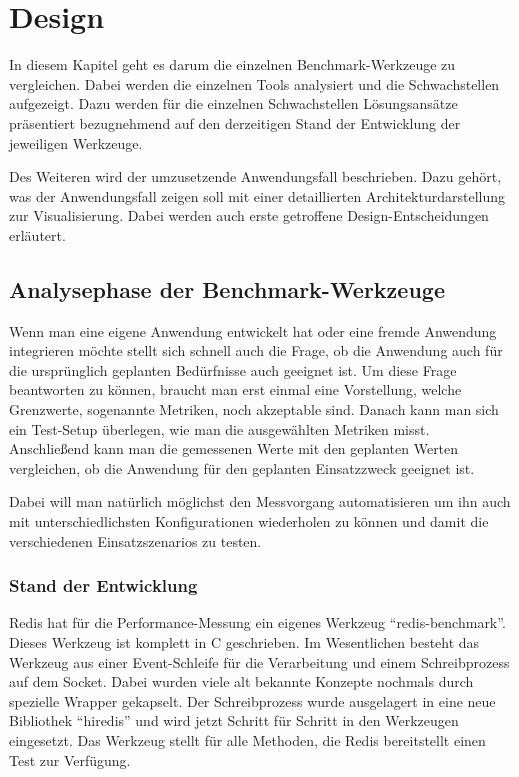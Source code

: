 \chapter{Design}
In diesem Kapitel geht es darum die einzelnen Benchmark-Werkzeuge zu
vergleichen. Dabei werden die einzelnen Tools analysiert und die Schwachstellen
aufgezeigt. Dazu werden für die einzelnen Schwachstellen Lösungsansätze
präsentiert bezugnehmend auf den derzeitigen Stand der Entwicklung der
jeweiligen Werkzeuge.

Des Weiteren wird der umzusetzende Anwendungsfall beschrieben. Dazu gehört, was
der Anwendungsfall zeigen soll mit einer detaillierten Architekturdarstellung
zur Visualisierung. Dabei werden auch erste getroffene Design-Entscheidungen
erläutert.

\section{Analysephase der Benchmark-Werkzeuge}
Wenn man eine eigene Anwendung entwickelt hat oder eine fremde Anwendung
integrieren möchte stellt sich schnell auch die Frage, ob die Anwendung auch für
die ursprünglich geplanten Bedürfnisse auch geeignet ist. Um diese Frage
beantworten zu können, braucht man erst einmal eine Vorstellung, welche
Grenzwerte, sogenannte Metriken, noch akzeptable sind. Danach kann man sich ein
Test-Setup überlegen, wie man die ausgewählten Metriken misst. Anschließend kann
man die gemessenen Werte mit den geplanten Werten vergleichen, ob die Anwendung
für den geplanten Einsatzzweck geeignet ist.

Dabei will man natürlich möglichst den Messvorgang automatisieren um ihn auch
mit unterschiedlichsten Konfigurationen wiederholen zu können und damit die
verschiedenen Einsatzszenarios zu testen.

\subsection{Stand der Entwicklung}
Redis hat für die Performance-Messung ein eigenes Werkzeug
\enquote{redis-benchmark}. Dieses Werkzeug ist komplett in C geschrieben. Im
Wesentlichen besteht das Werkzeug aus einer Event-Schleife für die Verarbeitung
und einem Schreibprozess auf dem Socket. Dabei wurden viele alt bekannte
Konzepte nochmals durch spezielle Wrapper gekapselt. Der Schreibprozess wurde
ausgelagert in eine neue Bibliothek \enquote{hiredis} und wird jetzt Schritt für
Schritt in den Werkzeugen eingesetzt. Das Werkzeug stellt für alle Methoden,
die Redis bereitstellt einen Test zur Verfügung.

